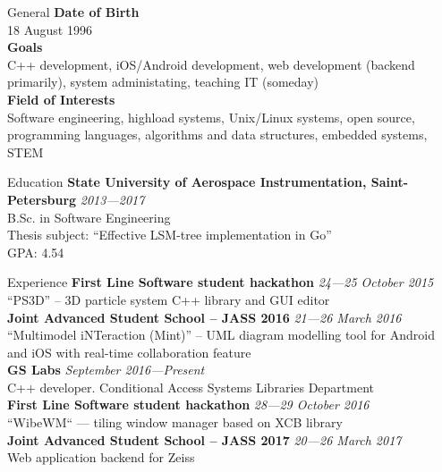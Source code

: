 \documentclass{resume}
\begin{document}
\begin{rSection}{General}
    {\bf Date of Birth} \\
        18 August 1996 \\
    {\bf Goals} \\
        C++ development, iOS\slash Android development, web development (backend primarily),
        system administating, teaching IT (someday) \\
    {\bf Field of Interests} \\
        Software engineering, highload systems, Unix/Linux systems, open source, programming languages,
        algorithms and data structures, embedded systems, STEM \\
\end{rSection}

\begin{rSection}{Education}
    {\bf State University of Aerospace Instrumentation, Saint-Petersburg} \hfill {\em 2013---2017} \\ 
    B.Sc. in Software Engineering \\
    Thesis subject: ``Effective LSM-tree implementation in Go'' \\
    GPA: 4.54
\end{rSection}

\begin{rSection}{Experience}
    {\bf First Line Software student hackathon} \hfill {\em 24---25 October 2015} \\
        ``PS3D'' -- 3D particle system C++ library and GUI editor \\
    {\bf Joint Advanced Student School -- JASS 2016} \hfill {\em 21---26 March 2016} \\
        ``Multimodel iNTeraction (Mint)'' -- UML diagram modelling tool for Android and iOS with real-time 
        collaboration feature \\
    {\bf GS Labs} \hfill {\em September 2016---Present} \\
        C++ developer. Conditional Access Systems Libraries Department \\
    {\bf First Line Software student hackathon} \hfill {\em 28---29 October 2016} \\
        ``WibeWM`` --- tiling window manager based on XCB library \\
    {\bf Joint Advanced Student School -- JASS 2017} \hfill {\em 20---26 March 2017} \\
        Web application backend for Zeiss \\
\end{rSection}
\end{document}
